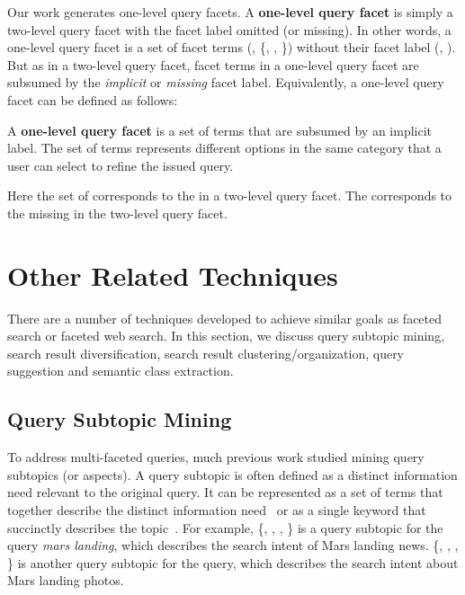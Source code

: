 Our work generates one-level query facets. A \textbf{one-level query facet} is simply a two-level query facet with the facet label omitted (or missing). In other words, a one-level query facet is a set of facet terms (\eg, \{, , \}) without their facet label (\eg, ). But as in a two-level query facet, facet terms in a one-level query facet are subsumed by the \textit{implicit} or \textit{missing} facet label. Equivalently, a one-level query facet can be defined as follows:
\begin{definition}
A \textbf{one-level query facet} is a set of terms that are subsumed by an implicit label. The set of terms represents different options in the same category that a user can select to refine the issued query.
\end{definition}
\noindent Here the set of  corresponds to the  in a two-level query facet. The  corresponds to the missing  in the two-level query facet. 


\section{Other Related Techniques}
\label{sec:bg-others}
There are a number of techniques developed to achieve similar goals as faceted search or faceted web search. In this section, we discuss query subtopic mining, search result diversification, search result clustering/organization, query suggestion and semantic class extraction.

\subsection{Query Subtopic Mining}
To address multi-faceted queries, much previous work studied mining query subtopics (or aspects). A query subtopic is often defined as a distinct information need relevant to the original query. It can be represented as a set of terms that together describe the distinct information need~\cite{wang2009mining,wu2011identifying, dang2011inferring} or as a single keyword that succinctly describes the topic~\cite{song2011overview}. For example, \{, , , \} is a query subtopic for the query \textit{mars landing}, which describes the search intent of Mars landing news. \{, , , \} is another query subtopic for the query, which describes the search intent about Mars landing photos.

